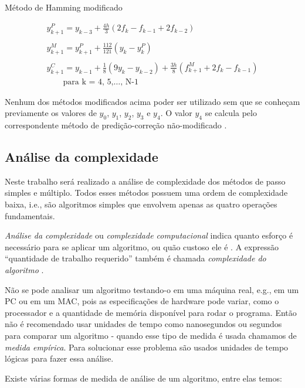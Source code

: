 Método de Hamming modificado

\begin{equation*}
\begin{split}
y^{P}_{k+1} = y_{k-3} + \frac{4h}{3}(2f_{k} - f_{k-1} + 2f_{k-2})\\
\\
y^{M}_{k+1} = y^{P}_{k+1} + \frac{112}{121}(y_{k} - y^{P}_{k})\\
\\
y^{C}_{k+1} = y_{k-1} + \frac{1}{8}(9y_{k} - y_{k-2}) + \frac{3h}{8}(f^{M}_{k+1} + 2f_{k} - f_{k-1})\\
\qquad \text{para k = 4, 5,$\dotsc$, N-1}
\end{split}
\end{equation*}

Nenhum dos métodos modificados acima poder ser utilizado sem que se conheçam previamente
os valores de $y_{0}$, $y_{1}$, $y_{2}$, $y_{3}$ e $y_{4}$. O valor $y_{4}$ se 
calcula pelo correspondente método de predição-correção não-modificado \cite{bronson}.

\subsection{Análise da complexidade}

Neste trabalho será realizado a análise de complexidade dos métodos de passo 
simples e múltiplo. Todos esses métodos possuem uma ordem de complexidade baixa, i.e.,
são algoritmos simples que envolvem apenas as quatro operações fundamentais.

\emph{Análise da complexidade} ou \emph{complexidade computacional} indica quanto
esforço é necessário para se aplicar um algoritmo, ou quão custoso ele é \cite{drozdek}.
A expressão ``quantidade de trabalho requerido'' também é chamada \emph{complexidade do algoritmo} \cite{toscani}.

Não se pode analisar um algoritmo testando-o em uma máquina real, e.g., em um PC ou
em um MAC, pois as especificações de hardware pode variar, como o processador e a
quantidade de memória disponível para rodar o programa. Então não é recomendado usar unidades
de tempo como nanosegundos ou segundos para comparar um algoritmo - quando esse tipo de medida é 
usada chamamos de \emph{medida empírica}. Para solucionar esse problema são usados 
unidades de tempo lógicas para fazer essa análise.

Existe várias formas de medida de análise de um algoritmo, entre elas temos:


